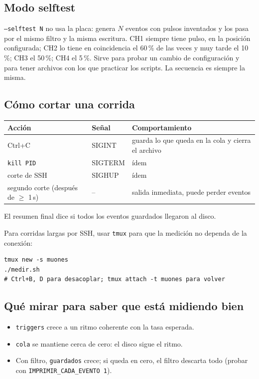 \documentclass[11pt,a4paper]{article}
\newcommand{\code}[1]{\texttt{#1}}
\begin{document}
\subsection{Modo selftest}

\code{--selftest N} no usa la placa: genera $N$ eventos con pulsos inventados y los
pasa por el mismo filtro y la misma escritura. CH1 siempre tiene pulso, en la
posición configurada; CH2 lo tiene en coincidencia el 60\,\% de las veces y muy
tarde el 10\,\%; CH3 el 50\,\%; CH4 el 5\,\%. Sirve para probar un cambio de
configuración y para tener archivos con los que practicar los scripts. La secuencia
es siempre la misma.

\subsection{Cómo cortar una corrida}

\begin{center}
\begin{tabular}{lll}
\toprule
Acción & Señal & Comportamiento \\
\midrule
Ctrl+C & SIGINT & guarda lo que queda en la cola y cierra el archivo \\
\code{kill PID} & SIGTERM & ídem \\
corte de SSH & SIGHUP & ídem \\
segundo corte (después de $\geq$ 1\,s) & -- & salida inmediata, puede perder eventos \\
\bottomrule
\end{tabular}
\end{center}

El resumen final dice si todos los eventos guardados llegaron al disco.

\begin{aviso}
Para corridas largas por SSH, usar \code{tmux} para que la medición no dependa de la
conexión:
\begin{lstlisting}[style=shell]
tmux new -s muones
./medir.sh
# Ctrl+B, D para desacoplar; tmux attach -t muones para volver
\end{lstlisting}
\end{aviso}

\subsection{Qué mirar para saber que está midiendo bien}

\begin{itemize}[itemsep=2pt]
  \item \code{triggers} crece a un ritmo coherente con la tasa esperada.
  \item \code{cola} se mantiene cerca de cero: el disco sigue el ritmo.
  \item Con filtro, \code{guardados} crece; si queda en cero, el filtro descarta
        todo (probar con \code{IMPRIMIR\_CADA\_EVENTO 1}).
\end{itemize}
\end{document}
